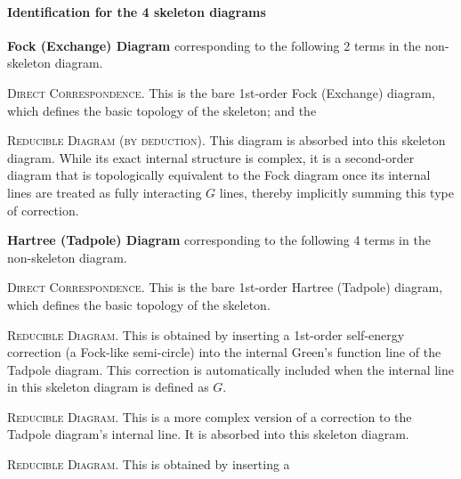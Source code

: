 \begin{solution}
  \paragraph{Identification for the 4 skeleton diagrams}
  \begin{enumext}
    \item \textbf{Fock (Exchange) Diagram} corresponding to the following 2
    terms in the non-skeleton diagram.
    \begin{enumext}[wrap-label = \underline{Term #1}:, label = \arabic*,
                    list-indent = 0pt]
      \setcounter{enumXii}{0}
      \item \textsc{Direct Correspondence.} This is the bare 1st-order
      Fock (Exchange) diagram, which defines the basic topology of the skeleton;
      and the
      \setcounter{enumXii}{6}
      \item \textsc{Reducible Diagram (by deduction).} This diagram is absorbed
      into this skeleton diagram. While its exact internal
      structure is complex, it is a second-order diagram that is topologically
      equivalent to the Fock diagram once its internal lines are treated as
      fully interacting $G$ lines, thereby implicitly summing this type of
      correction.
    \end{enumext}
    \item \textbf{Hartree (Tadpole) Diagram} corresponding to the following 4
    terms in the non-skeleton diagram.
    \begin{enumext}[wrap-label = \underline{Term #1}:, label = \arabic*,
                    list-indent = 0pt]
      \setcounter{enumXii}{1}
      \item \textsc{Direct Correspondence.} This is the bare 1st-order Hartree
      (Tadpole) diagram, which defines the basic topology of the skeleton.
      \setcounter{enumXii}{2}
      \item \textsc{Reducible Diagram.} This is obtained by inserting a
      1st-order self-energy correction (a Fock-like semi-circle) into the
      internal Green's function line of the Tadpole diagram. This correction is
      automatically included when the internal line in this skeleton diagram is
      defined as $G$.
      \setcounter{enumXii}{4}
      \item \textsc{Reducible Diagram.} This is a more complex version of a
      correction to the Tadpole diagram's internal line. It is absorbed into
      this skeleton diagram.
      \setcounter{enumXii}{5}
      \item \textsc{Reducible Diagram.} This is obtained by inserting a

\end{enumext}
\end{enumext}
\end{solution}
